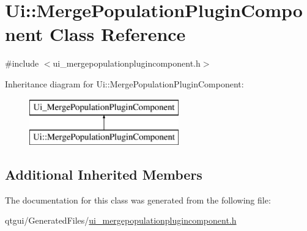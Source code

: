 \hypertarget{class_ui_1_1_merge_population_plugin_component}{}\section{Ui\+::Merge\+Population\+Plugin\+Component Class Reference}
\label{class_ui_1_1_merge_population_plugin_component}


{\ttfamily \#include $<$ui\+\_\+mergepopulationplugincomponent.\+h$>$}

Inheritance diagram for Ui\+::Merge\+Population\+Plugin\+Component\+:\begin{figure}[H]
\begin{center}
\leavevmode
\includegraphics[height=2.000000cm]{d5/d3e/class_ui_1_1_merge_population_plugin_component}
\end{center}
\end{figure}
\subsection*{Additional Inherited Members}


The documentation for this class was generated from the following file\+:\begin{DoxyCompactItemize}
\item 
qtgui/\+Generated\+Files/\mbox{\hyperlink{ui__mergepopulationplugincomponent_8h}{ui\+\_\+mergepopulationplugincomponent.\+h}}\end{DoxyCompactItemize}
